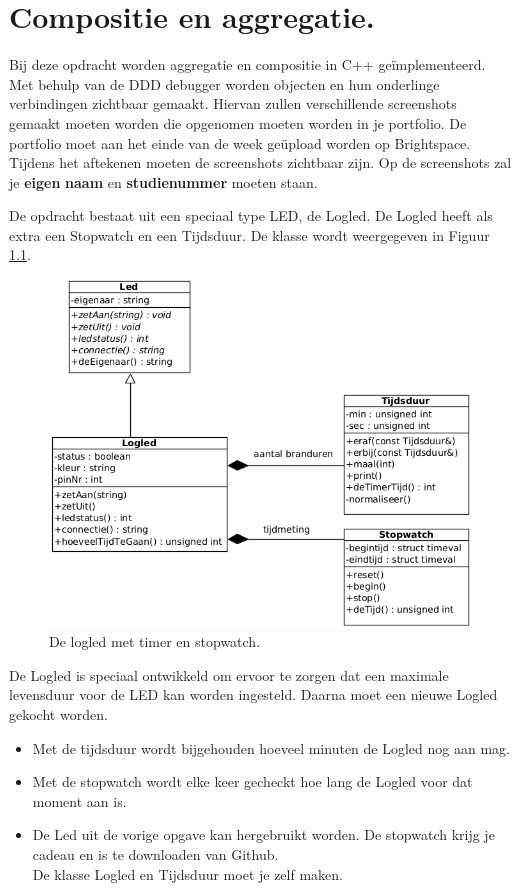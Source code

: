 \chapter{Compositie en aggregatie.}
\label{ch:hfstCompAgg}
Bij deze opdracht worden aggregatie en compositie in C++ geïmplementeerd. Met behulp van de DDD debugger worden objecten en hun onderlinge verbindingen zichtbaar gemaakt. Hiervan zullen verschillende screenshots gemaakt moeten worden die opgenomen  moeten worden in je portfolio. De portfolio moet aan het einde van de week geüpload worden op Brightspace. Tijdens het aftekenen moeten de screenshots zichtbaar zijn. Op de screenshots zal je \textbf{eigen} \textcolor{BrickRed}{\textbf{naam}} en \textcolor{BrickRed}{\textbf{studienummer}} moeten staan.

De opdracht bestaat uit een speciaal type LED, de Logled. De Logled heeft als extra een Stopwatch en een Tijdsduur. De klasse wordt weergegeven in Figuur \ref{fig:logled}.
    \begin{figure}[h!]
	\captionsetup{justification=centering}
	\includegraphics[width=0.9 \linewidth]{figuren/logled}      %
\centering
\caption{De logled met timer en stopwatch.}
\label{fig:logled}
\end{figure} 
De Logled is speciaal ontwikkeld om ervoor te zorgen dat een maximale levensduur voor de LED kan worden ingesteld. Daarna moet een nieuwe Logled gekocht worden. 
\begin{itemize}
	\item Met de tijdsduur wordt bijgehouden hoeveel minuten de Logled nog aan mag. 
	\item Met de stopwatch wordt elke keer gecheckt hoe lang de Logled voor dat moment aan is.
	\item De Led uit de vorige opgave kan hergebruikt worden. De stopwatch krijg je cadeau en is te downloaden van Github. \\De klasse Logled en Tijdsduur moet je zelf maken.
\end{itemize}

